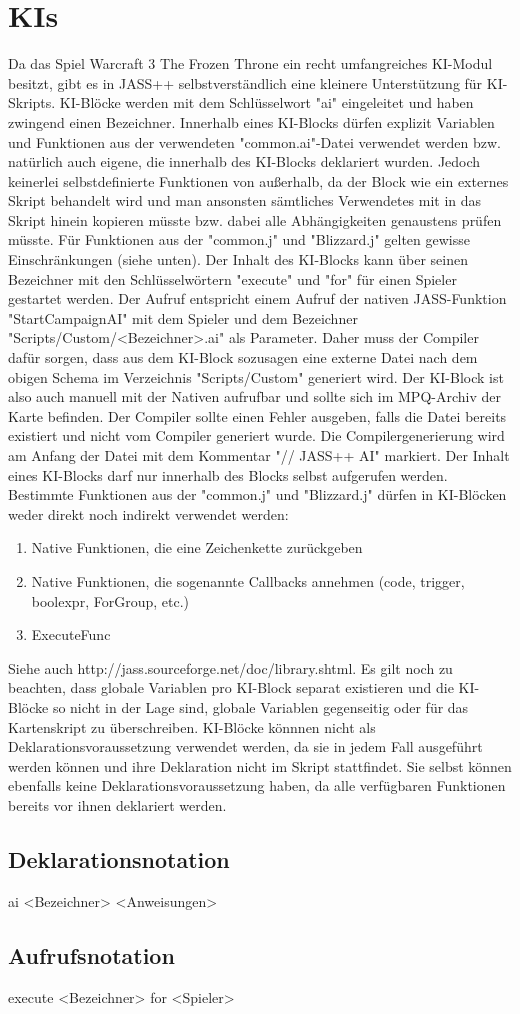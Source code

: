 \chapter{KIs}
Da das Spiel Warcraft 3 The Frozen Throne ein recht umfangreiches KI-Modul besitzt, gibt es in JASS++
selbstverständlich eine kleinere Unterstützung für KI-Skripts.
KI-Blöcke werden mit dem Schlüsselwort "ai" eingeleitet und haben zwingend einen Bezeichner.
Innerhalb eines KI-Blocks dürfen explizit Variablen und Funktionen aus der verwendeten "common.ai"-Datei
verwendet werden bzw. natürlich auch eigene, die innerhalb des KI-Blocks deklariert wurden.
Jedoch keinerlei selbstdefinierte Funktionen von außerhalb, da der Block wie ein externes Skript behandelt wird
und man ansonsten sämtliches Verwendetes mit in das Skript hinein kopieren müsste bzw. dabei alle Abhängigkeiten
genaustens prüfen müsste.
Für Funktionen aus der "common.j" und "Blizzard.j" gelten gewisse Einschränkungen (siehe unten).
Der Inhalt des KI-Blocks kann über seinen Bezeichner mit den Schlüsselwörtern "execute" und "for" für einen Spieler gestartet werden.
Der Aufruf entspricht einem Aufruf der nativen JASS-Funktion "StartCampaignAI" mit dem Spieler und dem Bezeichner "Scripts/Custom/<Bezeichner>.ai" als Parameter.
Daher muss der Compiler dafür sorgen, dass aus dem KI-Block sozusagen eine externe Datei nach dem obigen Schema im Verzeichnis "Scripts/Custom" generiert wird.
Der KI-Block ist also auch manuell mit der Nativen aufrufbar und sollte sich im MPQ-Archiv der Karte befinden. Der Compiler sollte einen Fehler ausgeben,
falls die Datei bereits existiert und nicht vom Compiler generiert wurde.
Die Compilergenerierung wird am Anfang der Datei mit dem Kommentar "// JASS++ AI" markiert.
Der Inhalt eines KI-Blocks darf nur innerhalb des Blocks selbst aufgerufen werden.
Bestimmte Funktionen aus der "common.j" und "Blizzard.j" dürfen in KI-Blöcken weder direkt noch indirekt verwendet werden:
\begin{enumerate}
\item Native Funktionen, die eine Zeichenkette zurückgeben
\item Native Funktionen, die sogenannte Callbacks annehmen (code, trigger, boolexpr, ForGroup, etc.)
\item ExecuteFunc
\end{enumerate}

Siehe auch http://jass.sourceforge.net/doc/library.shtml.
Es gilt noch zu beachten, dass globale Variablen pro KI-Block separat existieren und die KI-Blöcke so nicht in der Lage sind,
globale Variablen gegenseitig oder für das Kartenskript zu überschreiben.
KI-Blöcke könnnen nicht als Deklarationsvoraussetzung verwendet werden, da sie in jedem Fall ausgeführt werden können und
ihre Deklaration nicht im Skript stattfindet.
Sie selbst können ebenfalls keine Deklarationsvoraussetzung haben, da alle verfügbaren Funktionen bereits vor ihnen
deklariert werden.

\section{Deklarationsnotation}
ai <Bezeichner>
	<Anweisungen>

\section{Aufrufsnotation}
execute <Bezeichner> for <Spieler>
